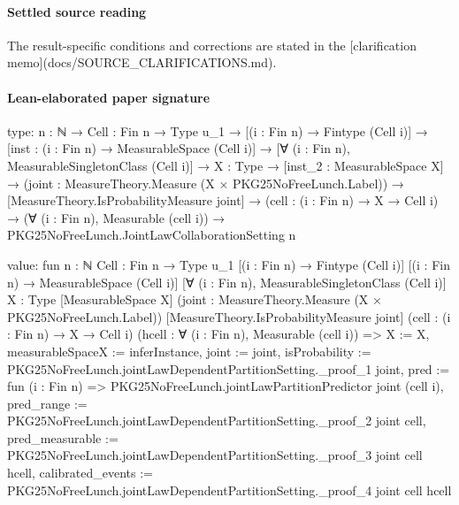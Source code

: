 \documentclass[10pt]{article}
\begin{document}
\paragraph{Settled source reading}
The result-\allowbreak{}specific conditions and corrections are stated in the [clarification memo](docs/\allowbreak{}SOURCE\_\allowbreak{}CLARIFICATIONS.\allowbreak{}md).\allowbreak{}

\paragraph{Lean-elaborated paper signature}
\begin{ReviewVerbatim}
type:
{n : ℕ} →
  {Cell : Fin n → Type u_1} →
    [(i : Fin n) → Fintype (Cell i)] →
      [inst : (i : Fin n) → MeasurableSpace (Cell i)] →
        [∀ (i : Fin n), MeasurableSingletonClass (Cell i)] →
          {X : Type} →
            [inst_2 : MeasurableSpace X] →
              (joint : MeasureTheory.Measure (X × PKG25NoFreeLunch.Label)) →
                [MeasureTheory.IsProbabilityMeasure joint] →
                  (cell : (i : Fin n) → X → Cell i) →
                    (∀ (i : Fin n), Measurable (cell i)) → PKG25NoFreeLunch.JointLawCollaborationSetting n

value:
fun {n : ℕ} {Cell : Fin n → Type u_1} [(i : Fin n) → Fintype (Cell i)] [(i : Fin n) → MeasurableSpace (Cell i)]
    [∀ (i : Fin n), MeasurableSingletonClass (Cell i)] {X : Type} [MeasurableSpace X]
    (joint : MeasureTheory.Measure (X × PKG25NoFreeLunch.Label)) [MeasureTheory.IsProbabilityMeasure joint]
    (cell : (i : Fin n) → X → Cell i) (hcell : ∀ (i : Fin n), Measurable (cell i)) =>
  { X := X, measurableSpaceX := inferInstance, joint := joint,
    isProbability := PKG25NoFreeLunch.jointLawDependentPartitionSetting._proof_1 joint,
    pred := fun (i : Fin n) => PKG25NoFreeLunch.jointLawPartitionPredictor joint (cell i),
    pred_range := PKG25NoFreeLunch.jointLawDependentPartitionSetting._proof_2 joint cell,
    pred_measurable := PKG25NoFreeLunch.jointLawDependentPartitionSetting._proof_3 joint cell hcell,
    calibrated_events := PKG25NoFreeLunch.jointLawDependentPartitionSetting._proof_4 joint cell hcell }
\end{ReviewVerbatim}
\end{document}
